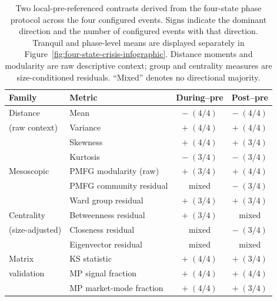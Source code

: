 \begin{table}[!t]
\centering
\caption{Two local-pre-referenced contrasts derived from the four-state phase protocol across the four configured events. Signs indicate the dominant direction and the number of configured events with that direction. Tranquil and phase-level means are displayed separately in Figure~\ref{fig:four-state-crisis-infographic}. Distance moments and modularity are raw descriptive context; group and centrality measures are size-conditioned residuals. ``Mixed'' denotes no directional majority.}
\label{tab:phase-concordance-core}
\scriptsize
\setlength{\tabcolsep}{5pt}
\renewcommand{\arraystretch}{0.88}
\begin{tabular*}{\linewidth}{@{\extracolsep{\fill}}llcc@{}}
\toprule
Family & Metric & During--pre & Post--pre \\
\midrule
Distance & Mean & $-\;(4/4)$ & $-\;(4/4)$ \\
(raw context) & Variance & $+\;(4/4)$ & $+\;(4/4)$ \\
& Skewness & $+\;(4/4)$ & $+\;(3/4)$ \\
& Kurtosis & $-\;(3/4)$ & $-\;(3/4)$ \\
\midrule
Mesoscopic & PMFG modularity (raw) & $+\;(3/4)$ & $+\;(4/4)$ \\
& PMFG community residual & mixed & $-\;(3/4)$ \\
& Ward group residual & $+\;(3/4)$ & $+\;(3/4)$ \\
\midrule
Centrality & Betweenness residual & $+\;(3/4)$ & mixed \\
(size-adjusted) & Closeness residual & mixed & $-\;(3/4)$ \\
& Eigenvector residual & mixed & mixed \\
\midrule
Matrix & KS statistic & $+\;(4/4)$ & $+\;(3/4)$ \\
validation & MP signal fraction & $+\;(4/4)$ & $+\;(4/4)$ \\
& MP market-mode fraction & $+\;(4/4)$ & $+\;(3/4)$ \\
\bottomrule
\end{tabular*}
\end{table}